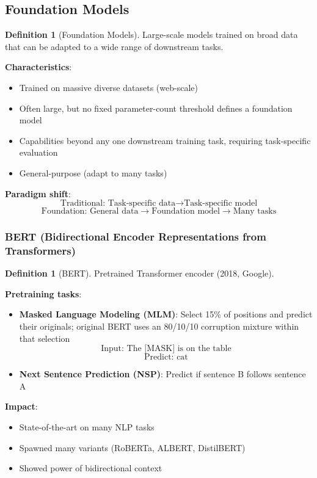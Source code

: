 \documentclass[11pt,twoside]{article}
\numberwithin{equation}{section}
\theoremstyle{plain}
\theoremstyle{definition}
\newtheorem{definition}[theorem]{Definition}
\theoremstyle{remark}
\begin{document}
\subsection{Foundation Models}

\begin{definition}[Foundation Models]
Large-scale models trained on broad data that can be adapted to a wide range of downstream tasks.

\textbf{Characteristics}:
\begin{itemize}
\item Trained on massive diverse datasets (web-scale)
\item Often large, but no fixed parameter-count threshold defines a foundation model
\item Capabilities beyond any one downstream training task, requiring task-specific evaluation
\item General-purpose (adapt to many tasks)
\end{itemize}

\textbf{Paradigm shift}: 
\[
\text{Traditional: Task-specific data} \to \text{Task-specific model}
\]
\[
\text{Foundation: General data} \to \text{Foundation model} \to \text{Many tasks}
\]
\end{definition}

\subsubsection{BERT (Bidirectional Encoder Representations from Transformers)}

\begin{definition}[BERT]
Pretrained Transformer encoder (2018, Google).

\textbf{Pretraining tasks}:
\begin{itemize}
\item \textbf{Masked Language Modeling (MLM)}: Select 15\% of positions and predict their originals; original BERT uses an 80/10/10 corruption mixture within that selection
\[
\text{Input: } \text{The [MASK] is on the table}
\]
\[
\text{Predict: } \text{cat}
\]
\item \textbf{Next Sentence Prediction (NSP)}: Predict if sentence B follows sentence A
\end{itemize}

\textbf{Impact}:
\begin{itemize}
\item State-of-the-art on many NLP tasks
\item Spawned many variants (RoBERTa, ALBERT, DistilBERT)
\item Showed power of bidirectional context
\end{itemize}
\end{definition}
\end{document}
